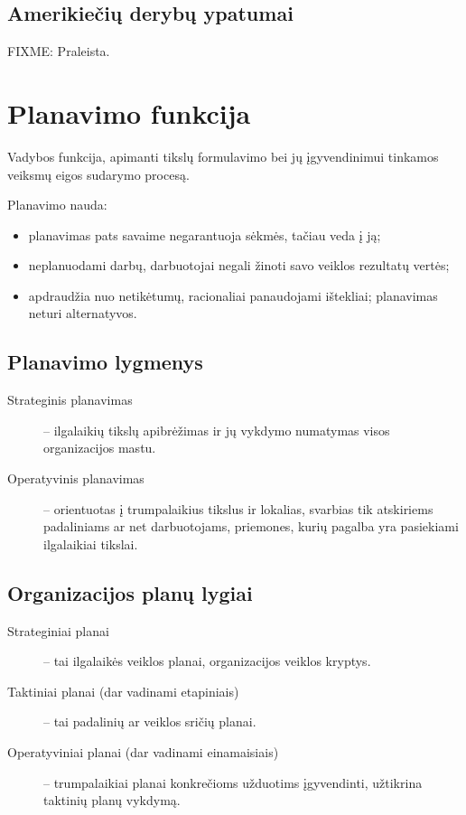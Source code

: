 \section{Amerikiečių derybų ypatumai}

FIXME: Praleista.

\chapter{Planavimo funkcija}

\begin{defn}[Planavimas]
  Vadybos funkcija, apimanti tikslų formulavimo bei jų įgyvendinimui
  tinkamos veiksmų eigos sudarymo procesą.
\end{defn}

Planavimo nauda:
\begin{itemize}
  \item planavimas pats savaime negarantuoja sėkmės, tačiau veda į ją;
  \item neplanuodami darbų, darbuotojai negali žinoti savo veiklos
    rezultatų vertės;
  \item apdraudžia nuo netikėtumų, racionaliai panaudojami ištekliai;
    planavimas neturi alternatyvos. %
\end{itemize}

\section{Planavimo lygmenys}

\begin{description}
  \item[Strateginis planavimas] – ilgalaikių tikslų apibrėžimas ir jų
    vykdymo numatymas visos organizacijos mastu.
  \item[Operatyvinis planavimas] – orientuotas į trumpalaikius tikslus
    ir lokalias, svarbias tik atskiriems padaliniams ar net darbuotojams,
    priemones, kurių pagalba yra pasiekiami ilgalaikiai tikslai.
\end{description}

\section{Organizacijos planų lygiai}

\begin{description}
  \item[Strateginiai planai] – tai ilgalaikės veiklos planai, organizacijos
    veiklos kryptys.
  \item[Taktiniai planai (dar vadinami etapiniais)] – tai padalinių
    ar veiklos sričių planai.
  \item[Operatyviniai planai (dar vadinami einamaisiais)] – trumpalaikiai
    planai konkrečioms užduotims įgyvendinti, užtikrina taktinių planų
    vykdymą.
\end{description}

